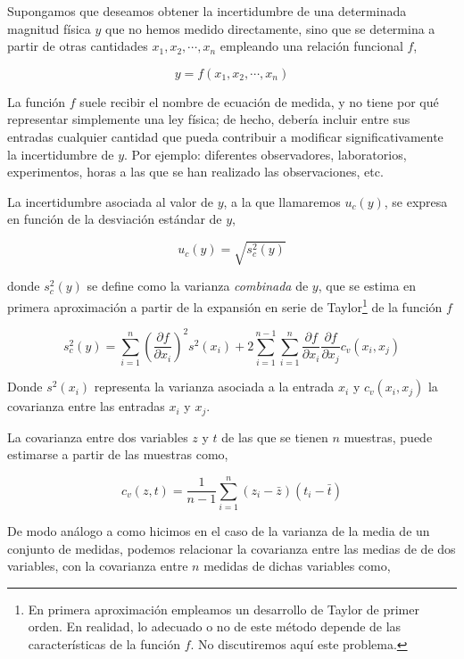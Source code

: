 Supongamos que deseamos obtener la incertidumbre de una determinada magnitud física $y$ que no hemos medido directamente, sino que se determina a partir de otras cantidades $x_1,x_2,\cdots,x_n$ empleando una relación funcional $f$,

\begin{equation*}
y = f(x_1,x_2,\cdots,x_n)
\end{equation*}

La función $f$ suele recibir el nombre de ecuación de medida, y no tiene por qué representar simplemente una ley física; de hecho, debería incluir entre sus entradas cualquier cantidad que pueda contribuir a modificar significativamente la incertidumbre de $y$. Por ejemplo: diferentes observadores, laboratorios, experimentos, horas a las que se han realizado las observaciones, etc.

La incertidumbre asociada al valor de $y$, a la que llamaremos $u_c(y)$, se expresa en función de la desviación estándar de $y$,  

\begin{equation*}
u_c(y) =\sqrt{s_c^2(y)}
\end{equation*}


donde  $s_c^2(y)$ se define como la  varianza \emph{combinada} de $y$, que se estima en primera aproximación a partir de la expansión en serie de Taylor\footnote{En primera aproximación empleamos un desarrollo de Taylor de primer orden. En realidad, lo adecuado o no de este método depende de las características de la función $f$. No discutiremos aquí este problema.} de la función $f$	

\begin{equation*}
s_c^2(y) = \sum_{i=1}^n\left(\frac{\partial f}{\partial x_i}\right)^2 s^2(x_i) + 2\sum_{i=1}^{n-1}\sum_{i=1}^n \frac{\partial f}{\partial x_i}\frac{\partial f}{\partial x_j} c_v(x_i,x_j)
\end{equation*}

Donde $s^2(x_i)$  representa la varianza asociada a la entrada $x_i$ y $c_v(x_i, x_j)$ la covarianza entre las entradas $x_i$ y $x_j$. 

La covarianza entre dos variables $z$ y $t$ de las que se tienen $n$ muestras, puede estimarse a partir de las muestras como,

\begin{equation*}
c_v(z,t) =\frac{1}{n-1}\sum_{i=1}^n(z_i-\bar{z})(t_i-\bar{t})
\end{equation*}

De modo análogo a como hicimos en el caso de la varianza de la media de un conjunto de medidas, podemos relacionar la covarianza entre las medias de  de dos variables, con la covarianza entre $n$ medidas de dichas variables como,

